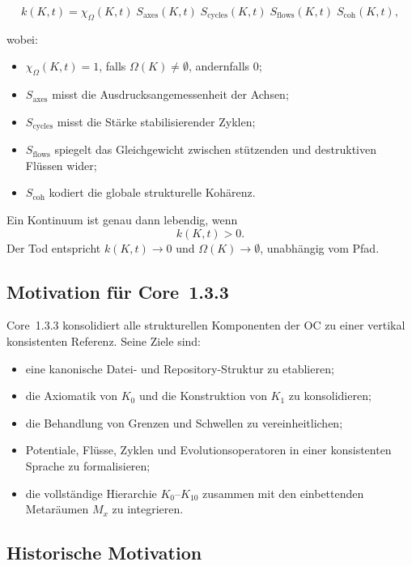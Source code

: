 \[
k(K,t) =
\chi_{\Omega}(K,t)\;
S_{\mathrm{axes}}(K,t)\;
S_{\mathrm{cycles}}(K,t)\;
S_{\mathrm{flows}}(K,t)\;
S_{\mathrm{coh}}(K,t),
\]

wobei:

\begin{itemize}
    \item \(\chi_{\Omega}(K,t)=1\), falls \(\Omega(K)\neq\emptyset\), andernfalls \(0\);
    \item \(S_{\mathrm{axes}}\) misst die Ausdrucksangemessenheit der Achsen;
    \item \(S_{\mathrm{cycles}}\) misst die Stärke stabilisierender Zyklen;
    \item \(S_{\mathrm{flows}}\) spiegelt das Gleichgewicht zwischen stützenden und destruktiven Flüssen wider;
    \item \(S_{\mathrm{coh}}\) kodiert die globale strukturelle Kohärenz.
\end{itemize}

Ein Kontinuum ist genau dann lebendig, wenn
\[
k(K,t) > 0.
\]
Der Tod entspricht \(k(K,t)\to 0\) und \(\Omega(K)\to\emptyset\), unabhängig vom Pfad.

\subsection{Motivation für Core~1.3.3}

Core~1.3.3 konsolidiert alle strukturellen Komponenten der OC zu einer vertikal konsistenten Referenz.  
Seine Ziele sind:

\begin{itemize}
    \item eine kanonische Datei- und Repository-Struktur zu etablieren;
    \item die Axiomatik von \(K_0\) und die Konstruktion von \(K_1\) zu konsolidieren;
    \item die Behandlung von Grenzen und Schwellen zu vereinheitlichen;
    \item Potentiale, Flüsse, Zyklen und Evolutionsoperatoren in einer konsistenten Sprache zu formalisieren;
    \item die vollständige Hierarchie \(K_0\)–\(K_{10}\) zusammen mit den einbettenden Metaräumen \(M_x\) zu integrieren.
\end{itemize}

\subsection{Historische Motivation}

